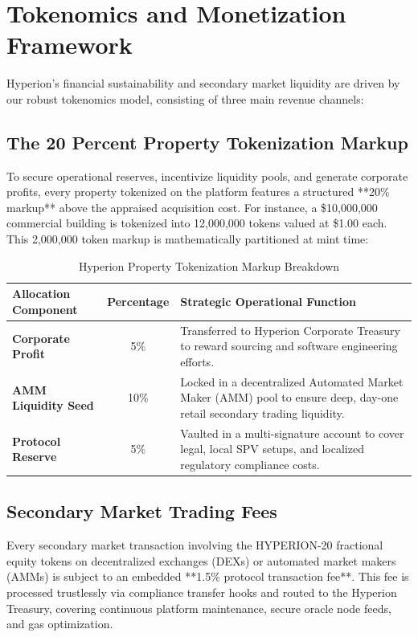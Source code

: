 \documentclass[11pt]{article}
\begin{document}
\section{Tokenomics and Monetization Framework}
Hyperion's financial sustainability and secondary market liquidity are driven by our robust tokenomics model, consisting of three main revenue channels:

\subsection{The 20 Percent Property Tokenization Markup}
To secure operational reserves, incentivize liquidity pools, and generate corporate profits, every property tokenized on the platform features a structured **20\% markup** above the appraised acquisition cost. For instance, a \$10,000,000 commercial building is tokenized into 12,000,000 tokens valued at \$1.00 each. This 2,000,000 token markup is mathematically partitioned at mint time:
\begin{table}[h!]
\centering
\begin{tabularx}{\textwidth}{l c X}
\toprule
\textbf{Allocation Component} & \textbf{Percentage} & \textbf{Strategic Operational Function} \\
\midrule
\textbf{Corporate Profit} & 5\% & Transferred to Hyperion Corporate Treasury to reward sourcing and software engineering efforts. \\
\textbf{AMM Liquidity Seed} & 10\% & Locked in a decentralized Automated Market Maker (AMM) pool to ensure deep, day-one retail secondary trading liquidity. \\
\textbf{Protocol Reserve} & 5\% & Vaulted in a multi-signature account to cover legal, local SPV setups, and localized regulatory compliance costs. \\
\bottomrule
\end{tabularx}
\caption{Hyperion Property Tokenization Markup Breakdown}
\end{table}

\subsection{Secondary Market Trading Fees}
Every secondary market transaction involving the HYPERION-20 fractional equity tokens on decentralized exchanges (DEXs) or automated market makers (AMMs) is subject to an embedded **1.5\% protocol transaction fee**. This fee is processed trustlessly via compliance transfer hooks and routed to the Hyperion Treasury, covering continuous platform maintenance, secure oracle node feeds, and gas optimization.
\end{document}
